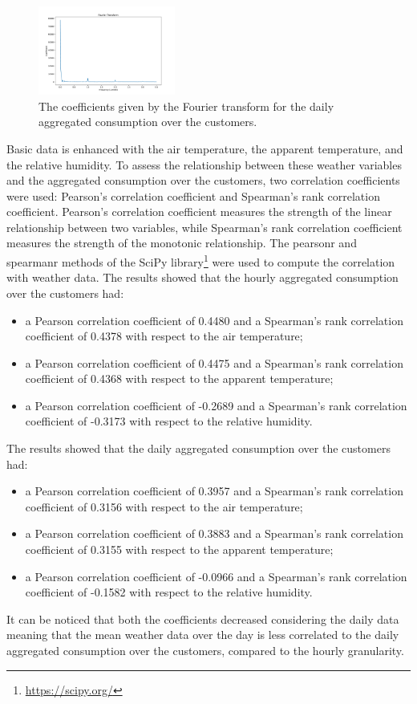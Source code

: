 \begin{figure}[H]
\centering
\includegraphics[width=0.4\textwidth]{images/demand/ft_day}
\caption{The coefficients given by the Fourier transform for the daily aggregated consumption over the customers.}
\label{fig:demandftday}
\end{figure}

Basic data is enhanced with the air temperature, the apparent temperature, and the relative humidity.
To assess the relationship between these weather variables and the aggregated consumption over the customers, two correlation coefficients were used: Pearson's correlation coefficient and Spearman's rank correlation coefficient.
Pearson's correlation coefficient measures the strength of the linear relationship between two variables, while Spearman's rank correlation coefficient measures the strength of the monotonic relationship.
The pearsonr and spearmanr methods of the SciPy library\footnote{ \url{https://scipy.org/} } were used to compute the correlation with weather data.
The results showed that the hourly aggregated consumption over the customers had:
\begin{itemize}
  \item a Pearson correlation coefficient of 0.4480 and a Spearman's rank correlation coefficient of 0.4378 with respect to the air temperature;
  \item a Pearson correlation coefficient of 0.4475 and a Spearman's rank correlation coefficient of 0.4368 with respect to the apparent temperature;
  \item a Pearson correlation coefficient of -0.2689 and a Spearman's rank correlation coefficient of -0.3173 with respect to the relative humidity.
\end{itemize}

The results showed that the daily aggregated consumption over the customers had:
\begin{itemize}
  \item a Pearson correlation coefficient of 0.3957 and a Spearman's rank correlation coefficient of 0.3156 with respect to the air temperature;
  \item a Pearson correlation coefficient of 0.3883 and a Spearman's rank correlation coefficient of 0.3155 with respect to the apparent temperature;
  \item a Pearson correlation coefficient of -0.0966 and a Spearman's rank correlation coefficient of -0.1582 with respect to the relative humidity.
\end{itemize}
It can be noticed that both the coefficients decreased considering the daily data meaning that the mean weather data over the day is less correlated to the daily aggregated consumption over the customers, compared to the hourly granularity.

